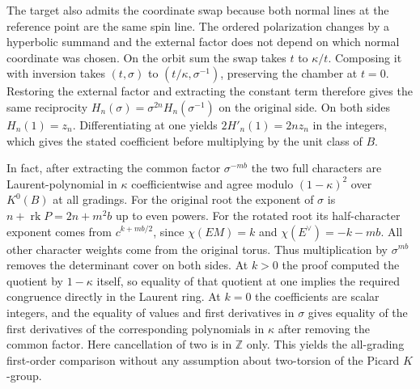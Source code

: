 The target also admits the coordinate swap because both normal lines at the reference point are the same spin line. The ordered polarization changes by a hyperbolic summand and the external factor does not depend on which normal coordinate was chosen. On the orbit sum the swap takes $t$ to $\kappa/t$. Composing it with inversion takes $(t,\sigma)$ to $(t/\kappa,\sigma^{-1})$, preserving the chamber at $t=0$. Restoring the external factor and extracting the constant term therefore gives the same reciprocity $H_n(\sigma)=\sigma^{2n}H_n(\sigma^{-1})$ on the original side. On both sides $H_n(1)=z_n$. Differentiating at one yields $2H'_n(1)=2nz_n$ in the integers, which gives the stated coefficient before multiplying by the unit class of $B$.

In fact, after extracting the common factor $\sigma^{-mb}$ the two full characters are Laurent-polynomial in $\kappa$ coefficientwise and agree modulo $(1-\kappa)^2$ over $K^0(B)$ at all gradings. For the original root the exponent of $\sigma$ is $n+\operatorname{rk}P=2n+m^2b$ up to even powers. For the rotated root its half-character exponent comes from $c^{k+mb/2}$, since $\chi(EM)=k$ and $\chi(E^\vee)=-k-mb$. All other character weights come from the original torus. Thus multiplication by $\sigma^{mb}$ removes the determinant cover on both sides. At $k>0$ the proof computed the quotient by $1-\kappa$ itself, so equality of that quotient at one implies the required congruence directly in the Laurent ring. At $k=0$ the coefficients are scalar integers, and the equality of values and first derivatives in $\sigma$ gives equality of the first derivatives of the corresponding polynomials in $\kappa$ after removing the common factor. Here cancellation of two is in $\mathbb Z$ only. This yields the all-grading first-order comparison without any assumption about two-torsion of the Picard $K$-group.
